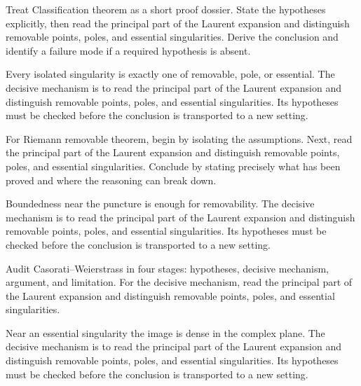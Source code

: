 \begin{problem}\label{prob:iv09-problem-04}
Treat Classification theorem as a short proof dossier. State the hypotheses explicitly, then read the principal part of the Laurent expansion and distinguish removable points, poles, and essential singularities. Derive the conclusion and identify a failure mode if a required hypothesis is absent.
\end{problem}
\begin{solution}
Every isolated singularity is exactly one of removable, pole, or essential. The decisive mechanism is to read the principal part of the Laurent expansion and distinguish removable points, poles, and essential singularities. Its hypotheses must be checked before the conclusion is transported to a new setting.
\end{solution}

\begin{problem}\label{prob:iv09-problem-05}
For Riemann removable theorem, begin by isolating the assumptions. Next, read the principal part of the Laurent expansion and distinguish removable points, poles, and essential singularities. Conclude by stating precisely what has been proved and where the reasoning can break down.
\end{problem}
\begin{solution}
Boundedness near the puncture is enough for removability. The decisive mechanism is to read the principal part of the Laurent expansion and distinguish removable points, poles, and essential singularities. Its hypotheses must be checked before the conclusion is transported to a new setting.
\end{solution}

\begin{problem}\label{prob:iv09-problem-06}
Audit Casorati--Weierstrass in four stages: hypotheses, decisive mechanism, argument, and limitation. For the decisive mechanism, read the principal part of the Laurent expansion and distinguish removable points, poles, and essential singularities.
\end{problem}
\begin{solution}
Near an essential singularity the image is dense in the complex plane. The decisive mechanism is to read the principal part of the Laurent expansion and distinguish removable points, poles, and essential singularities. Its hypotheses must be checked before the conclusion is transported to a new setting.
\end{solution}

